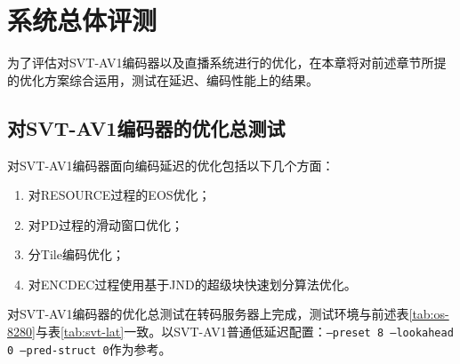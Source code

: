 \chapter{系统总体评测}
为了评估对SVT-AV1编码器以及直播系统进行的优化，在本章将对前述章节所提的优化方案综合运用，测试在延迟、编码性能上的结果。

\section{对SVT-AV1编码器的优化总测试}
	对SVT-AV1编码器面向编码延迟的优化包括以下几个方面：
	\begin{enumerate}[label=\arabic*)]
		\item 对RESOURCE过程的EOS优化；
		\item 对PD过程的滑动窗口优化；
		\item 分Tile编码优化；
		\item 对ENCDEC过程使用基于JND的超级块快速划分算法优化。
	\end{enumerate}

	对SVT-AV1编码器的优化总测试在转码服务器上完成，测试环境与前述表\ref{tab:os-8280}与表\ref{tab:svt-lat}一致。以SVT-AV1普通低延迟配置：\texttt{--preset 8 --lookahead 0 --pred-struct 0}作为参考。

